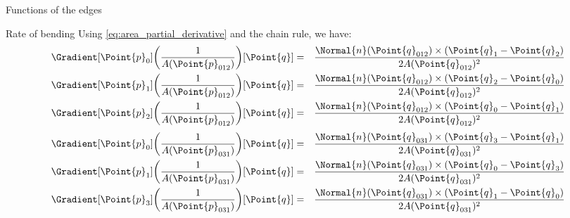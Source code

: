 \begin{plSection}{Functions of the edges}
\begin{plSection}{Rate of bending}
Using \cref{eq:area_partial_derivative}
and the chain rule, we have:
\begin{eqnarray}
\label{eq:inverse-area-gradient-012}
\Gradient[\Point{p}_0]
{\left( \frac{1}{A(\Point{p}_{012})} \right)}
[\Point{q}]
& = &
{{\Normal{n}(\Point{q}_{012}) \times 
\left( \Point{q}_1 - \Point{q}_2 \right)}
\over
{2 A(\Point{q}_{012})^2 } }
\\
\Gradient[\Point{p}_1]
{\left( \frac{1}{A(\Point{p}_{012})} \right)}
[\Point{q}]
& = &
{{\Normal{n}(\Point{q}_{012}) \times
 \left( \Point{q}_2 - \Point{q}_0 \right)}
\over
{2 A(\Point{q}_{012})^2 } }
\nonumber
\\
\Gradient[\Point{p}_2]
{\left( \frac{1}{A(\Point{p}_{012})} \right)}
[\Point{q}]
& = &
{{\Normal{n}(\Point{q}_{012}) \times 
\left( \Point{q}_0 - \Point{q}_1 \right)}
\over
{2 A(\Point{q}_{012})^2 } }
\nonumber
\end{eqnarray}
\begin{eqnarray}
\label{eq:inverse-area-gradient-031}
\Gradient[\Point{p}_0]
{\left( \frac{1}{A(\Point{p}_{031})} \right)}
[\Point{q}]
& = &
{{\Normal{n}(\Point{q}_{031}) \times
 \left( \Point{q}_3 - \Point{q}_1 \right)}
\over
{2 A(\Point{q}_{031})^2 } }
\\
\Gradient[\Point{p}_1]
{\left( \frac{1}{A(\Point{p}_{031})} \right)}
[\Point{q}]
& = &
{{\Normal{n}(\Point{q}_{031}) \times 
\left( \Point{q}_0 - \Point{q}_3 \right)}
\over
{2 A(\Point{q}_{031})^2 } }
\nonumber
\\
\Gradient[\Point{p}_3]
{\left( \frac{1}{A(\Point{p}_{031})} \right)}
[\Point{q}]
& = &
{{\Normal{n}(\Point{q}_{031}) \times 
\left( \Point{q}_1 - \Point{q}_0 \right)}
\over
{2 A(\Point{q}_{031})^2 } }
\nonumber
\end{eqnarray}

\end{plSection}%
\end{plSection}%
